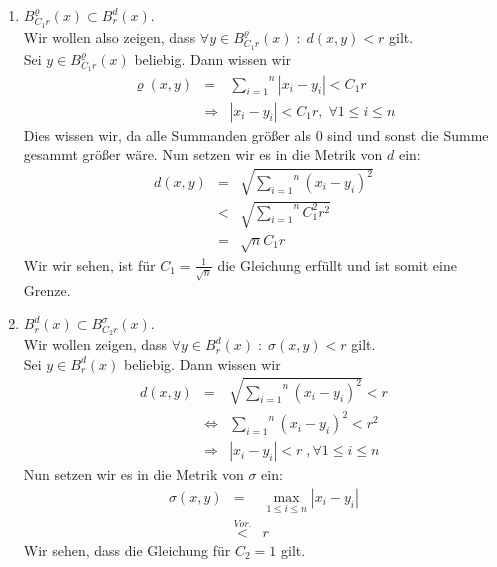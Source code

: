 \begin{enumerate}[\itshape a)]

    \item $B^\varrho_{C_1r} (x) \subset B^d_r (x)$.\\
        Wir wollen also zeigen, dass $\forall y \in B_{C_1r}^\varrho (x) \; : \; d(x,y) < r$ gilt.\\
        Sei $y \in B_{C_1r}^\varrho (x)$ beliebig. Dann wissen wir
        $$\begin{array}{rcl}
            \varrho (x,y)   &=& \overset{n}{\underset{i=1}{\sum}} |x_i - y_i| < C_1r\\
                            &\Rightarrow& |x_i - y_i| < C_1r, \; \forall 1 \leq i \leq n
        \end{array}$$
        Dies wissen wir, da alle Summanden größer als $0$ sind und sonst die Summe gesammt größer wäre.
        Nun setzen wir es in die Metrik von $d$ ein:
        $$\begin{array}{rcl}
            d(x,y)  &=& \sqrt{\overset{n}{\underset{i=1}{\sum}} (x_i - y_i)^2}\\
                    &<& \sqrt{\overset{n}{\underset{i=1}{\sum}} C_1^2 r^2}\\
                    &=& \sqrt{n} C_1 r
        \end{array}$$
        Wir wir sehen, ist für $C_1 = \frac{1}{\sqrt{n}}$ die Gleichung erfüllt und ist somit eine Grenze.

    \item $B_r^d (x) \subset B_{C_2r}^\sigma (x)$.\\
        Wir wollen zeigen, dass $\forall y \in B_r^d (x) \; : \; \sigma (x,y) < r$ gilt.\\
        Sei $y \in B_r^d (x)$ beliebig. Dann wissen wir
        $$\begin{array}{rcl}
            d(x,y)  &=& \sqrt{\overset{n}{\underset{i=1}{\sum}} (x_i - y_i)^2} < r\\
                    &\Leftrightarrow& \overset{n}{\underset{i=1}{\sum}} (x_i - y_i)^2 < r^2\\
                    &\Rightarrow& |x_i - y_i| < r \; , \forall 1 \leq i \leq n 
        \end{array}$$
        Nun setzen wir es in die Metrik von $\sigma$ ein:
        $$\begin{array}{rcl}
            \sigma (x,y)    &=& \underset{1 \leq i \leq n}{\max} |x_i - y_i|\\
                            &\stackrel{Vor.}{<}& r
        \end{array}$$
        Wir sehen, dass die Gleichung für $C_2 = 1$ gilt.


\end{enumerate}
